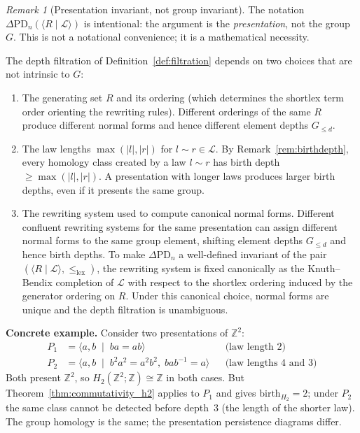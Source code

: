 \documentclass{article}
\theoremstyle{definition}
\theoremstyle{remark}
\newtheorem{remark}[theorem]{Remark}
\begin{document}
\begin{remark}[Presentation invariant, not group invariant]
\label{rem:presentationinvariant}
The notation $\Delta\mathrm{PD}_n(\langle R \mid \mathcal{L} \rangle)$
is intentional: the argument is the \emph{presentation}, not the
group $G$. This is not a notational convenience; it is a
mathematical necessity.

The depth filtration of Definition~\ref{def:filtration} depends on
two choices that are not intrinsic to $G$:
\begin{enumerate}[label=(\roman*)]
  \item The generating set $R$ and its ordering (which determines
        the shortlex term order orienting the rewriting rules).
        Different orderings of the same $R$ produce different
        normal forms and hence different element depths
        $G_{\leq d}$.
  \item The law lengths $\max(|l|, |r|)$ for $l \sim r \in \mathcal{L}$.
        By Remark~\ref{rem:birthdepth}, every homology class created
        by a law $l \sim r$ has birth depth $\geq \max(|l|, |r|)$.
        A presentation with longer laws produces larger birth
        depths, even if it presents the same group.
  \item The rewriting system used to compute canonical normal forms.
        Different confluent rewriting systems for the same presentation
        can assign different normal forms to the same group element,
        shifting element depths $G_{\leq d}$ and hence birth depths.
        To make $\Delta\mathrm{PD}_n$ a well-defined invariant of the
        pair $(\langle R \mid \mathcal{L} \rangle, \leq_{\mathrm{lex}})$,
        the rewriting system is fixed canonically as the Knuth--Bendix
        completion of $\mathcal{L}$ with respect to the shortlex
        ordering induced by the generator ordering on $R$.
        Under this canonical choice, normal forms are unique and
        the depth filtration is unambiguous.
\end{enumerate}

\textbf{Concrete example.} Consider two presentations of
$\mathbb{Z}^2$:
\begin{align*}
  P_1 &= \langle a, b \;\mid\; ba = ab \rangle
  && \text{(law length } 2\text{)} \\
  P_2 &= \langle a, b \;\mid\; b^2 a^2 = a^2 b^2,\; bab^{-1} = a \rangle
  && \text{(law lengths } 4 \text{ and } 3\text{)}
\end{align*}
Both present $\mathbb{Z}^2$, so $H_2(\mathbb{Z}^2;\mathbb{Z}) \cong \mathbb{Z}$
in both cases. But Theorem~\ref{thm:commutativity_h2} applies to
$P_1$ and gives $\mathrm{birth}_{H_2} = 2$; under $P_2$ the
same class cannot be detected before depth~$3$ (the length of
the shorter law). The group homology is the same; the presentation
persistence diagrams differ.


\end{remark}
\end{document}
